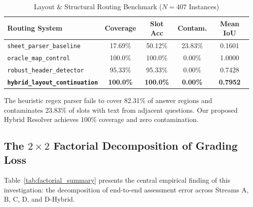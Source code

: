 \documentclass[journal]{IEEEtran}
\begin{document}
\begin{table}[htbp]
\centering
\caption{Layout \& Structural Routing Benchmark ($N = 407$ Instances)}
\label{tab:routing_benchmark}
\begin{tabular}{lcccc}
\toprule
\textbf{Routing System} & \textbf{Coverage} & \textbf{Slot Acc} & \textbf{Contam.} & \textbf{Mean IoU} \\
\midrule
\texttt{sheet\_parser\_baseline} & 17.69\% & 50.12\% & 23.83\% & 0.1601 \\
\texttt{oracle\_map\_control} & 100.0\% & 100.0\% & 0.00\% & 1.0000 \\
\texttt{robust\_header\_detector} & 95.33\% & 95.33\% & 0.00\% & 0.7428 \\
\textbf{\texttt{hybrid\_layout\_continuation}} & \textbf{100.0\%} & \textbf{100.0\%} & \textbf{0.00\%} & \textbf{0.7952} \\
\bottomrule
\end{tabular}
\end{table}

The heuristic regex parser fails to cover 82.31\% of answer regions and contaminates 23.83\% of slots with text from adjacent questions. Our proposed Hybrid Resolver achieves 100\% coverage and zero contamination.

\subsection{The $2\times 2$ Factorial Decomposition of Grading Loss}
Table~\ref{tab:factorial_summary} presents the central empirical finding of this investigation: the decomposition of end-to-end assessment error across Streams A, B, C, D, and D-Hybrid.
\end{document}
